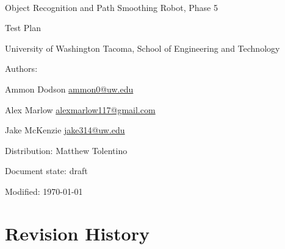 \documentclass[english,12pt]{article}
\begin{document}
\begin{center}

\thispagestyle{empty}

$ $

\vspace{250pt}

\begin{bfseries}

{\Large Object Recognition and Path Smoothing Robot, Phase 5}

{\Huge Test Plan}


\end{bfseries}

\vspace{180pt}

University of Washington Tacoma, School of Engineering and Technology


\vspace{12pt}

Authors: 

Ammon Dodson \href{mailto:ammon0@uw.edu}{ammon0@uw.edu} 

Alex Marlow \href{mailto:alexmarlow117@gmail.com}{alexmarlow117@gmail.com} 

Jake McKenzie \href{mailto:jake314@uw.edu}{jake314@uw.edu}

Distribution: Matthew Tolentino

Document state: draft

Modified: \today

\end{center}

\newpage


\tableofcontents

\newpage


\section{Revision History}
\end{document}
